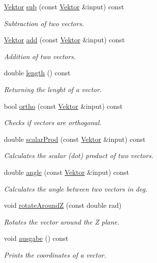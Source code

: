\begin{DoxyCompactItemize}
\hyperlink{class_vektor}{Vektor} \hyperlink{class_vektor_a9e095d5d627ad26c7c2d6f227567e731}{sub} (const \hyperlink{class_vektor}{Vektor} \&input) const
\begin{DoxyCompactList}\small\item\em Subtraction of two vectors. \end{DoxyCompactList}\item 
\hyperlink{class_vektor}{Vektor} \hyperlink{class_vektor_aeafef3c21fdf2ad7edca844826e111bf}{add} (const \hyperlink{class_vektor}{Vektor} \&input) const
\begin{DoxyCompactList}\small\item\em Addition of two vectors. \end{DoxyCompactList}\item 
double \hyperlink{class_vektor_aa17fc7f816fc425482b17fdafc45a4ed}{length} () const
\begin{DoxyCompactList}\small\item\em Returning the lenght of a vector. \end{DoxyCompactList}\item 
bool \hyperlink{class_vektor_a4624deedf4290c110ff4cfb756184f39}{ortho} (const \hyperlink{class_vektor}{Vektor} \&input) const
\begin{DoxyCompactList}\small\item\em Checks if vectors are orthogonal. \end{DoxyCompactList}\item 
double \hyperlink{class_vektor_ad517a8ae863c578a6d46c924ff3db1d5}{scalar\+Prod} (const \hyperlink{class_vektor}{Vektor} \&input) const
\begin{DoxyCompactList}\small\item\em Calculates the scalar (dot) product of two vectors. \end{DoxyCompactList}\item 
double \hyperlink{class_vektor_a33baaca0958a73d60f19500ad59d4288}{angle} (const \hyperlink{class_vektor}{Vektor} \&input) const
\begin{DoxyCompactList}\small\item\em Calculates the angle between two vectors in deg. \end{DoxyCompactList}\item 
void \hyperlink{class_vektor_a263858396c9751b803946e86947066e5}{rotate\+AroundZ} (const double rad)
\begin{DoxyCompactList}\small\item\em Rotates the vector around the Z plane. \end{DoxyCompactList}\item 
\mbox{\label{class_vektor_aa3c41759f0a472327a8970878234675a}} 
void \hyperlink{class_vektor_aa3c41759f0a472327a8970878234675a}{ausgabe} () const
\begin{DoxyCompactList}\small\item\em Prints the coordinates of a vector. \end{DoxyCompactList}\end{DoxyCompactItemize}


